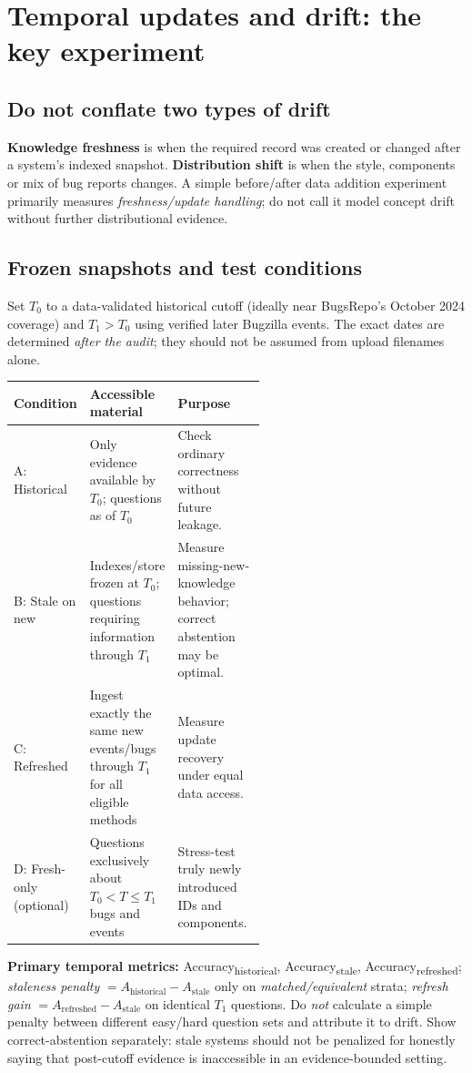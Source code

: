 \documentclass[11pt,a4paper]{article}
\begin{document}
\section{Temporal updates and drift: the key experiment}
\subsection{Do not conflate two types of drift}
\textbf{Knowledge freshness} is when the required record was created or changed after a system's indexed snapshot. \textbf{Distribution shift} is when the style, components or mix of bug reports changes. A simple before/after data addition experiment primarily measures \emph{freshness/update handling}; do not call it model concept drift without further distributional evidence.

\subsection{Frozen snapshots and test conditions}
Set $T_0$ to a data-validated historical cutoff (ideally near BugsRepo's October 2024 coverage) and $T_1>T_0$ using verified later Bugzilla events. The exact dates are determined \emph{after the audit}; they should not be assumed from upload filenames alone.

\begin{tabularx}{\linewidth}{@{}p{0.24\linewidth}p{0.31\linewidth}X@{}}\toprule
\textbf{Condition}&\textbf{Accessible material}&\textbf{Purpose}\\\midrule
A: Historical&Only evidence available by $T_0$; questions as of $T_0$&Check ordinary correctness without future leakage.\\
B: Stale on new&Indexes/store frozen at $T_0$; questions requiring information through $T_1$&Measure missing-new-knowledge behavior; correct abstention may be optimal.\\
C: Refreshed&Ingest exactly the same new events/bugs through $T_1$ for all eligible methods&Measure update recovery under equal data access.\\
D: Fresh-only (optional)&Questions exclusively about $T_0<T\le T_1$ bugs and events&Stress-test truly newly introduced IDs and components.\\\bottomrule
\end{tabularx}

\textbf{Primary temporal metrics:} Accuracy\textsubscript{historical}, Accuracy\textsubscript{stale}, Accuracy\textsubscript{refreshed}; \emph{staleness penalty} $=A_{\mathrm{historical}}-A_{\mathrm{stale}}$ only on \emph{matched/equivalent} strata; \emph{refresh gain} $=A_{\mathrm{refreshed}}-A_{\mathrm{stale}}$ on identical $T_1$ questions. Do \emph{not} calculate a simple penalty between different easy/hard question sets and attribute it to drift. Show correct-abstention separately: stale systems should not be penalized for honestly saying that post-cutoff evidence is inaccessible in an evidence-bounded setting.
\end{document}
